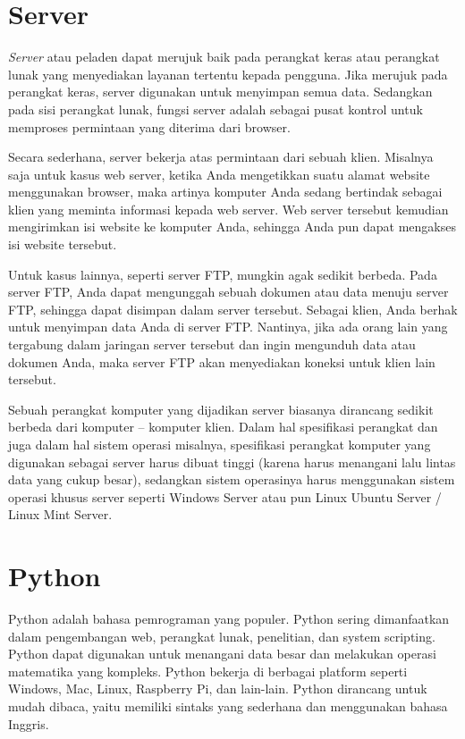 \section{Server}
\par \textit{Server} atau peladen dapat merujuk baik pada perangkat keras atau perangkat lunak yang menyediakan layanan tertentu kepada pengguna. Jika merujuk pada perangkat keras, server digunakan untuk menyimpan semua data. Sedangkan pada sisi perangkat lunak, fungsi server adalah sebagai pusat kontrol untuk memproses permintaan yang diterima dari browser.

\par Secara sederhana, server bekerja atas permintaan dari sebuah klien. Misalnya saja untuk kasus web server, ketika Anda mengetikkan suatu alamat website menggunakan browser, maka artinya komputer Anda sedang bertindak sebagai klien yang meminta informasi kepada web server. Web server tersebut kemudian mengirimkan isi website ke komputer Anda, sehingga Anda pun dapat mengakses isi website tersebut.

\par Untuk kasus lainnya, seperti server FTP, mungkin agak sedikit berbeda. Pada server FTP, Anda dapat mengunggah sebuah dokumen atau data menuju server FTP, sehingga dapat disimpan dalam server tersebut. Sebagai klien, Anda berhak untuk menyimpan data Anda di server FTP. Nantinya, jika ada orang lain yang tergabung dalam jaringan server tersebut dan ingin mengunduh data atau dokumen Anda, maka server FTP akan menyediakan koneksi untuk klien lain tersebut.

\par Sebuah perangkat komputer yang dijadikan server biasanya dirancang sedikit berbeda dari komputer – komputer klien. Dalam hal spesifikasi perangkat dan juga dalam hal sistem operasi misalnya, spesifikasi perangkat komputer yang digunakan sebagai server harus dibuat tinggi (karena harus menangani lalu lintas data yang cukup besar), sedangkan sistem operasinya harus menggunakan sistem operasi khusus server seperti Windows Server atau pun Linux Ubuntu Server / Linux Mint Server\cite{server_def}.

\section{Python}
\par Python adalah bahasa pemrograman yang populer. Python sering dimanfaatkan dalam pengembangan web, perangkat lunak, penelitian, dan system scripting. Python dapat digunakan untuk menangani data besar dan melakukan operasi matematika yang kompleks. Python bekerja di berbagai platform seperti Windows, Mac, Linux, Raspberry Pi, dan lain-lain. Python dirancang untuk mudah dibaca, yaitu memiliki sintaks yang sederhana dan
menggunakan bahasa Inggris\cite{python_def}.

